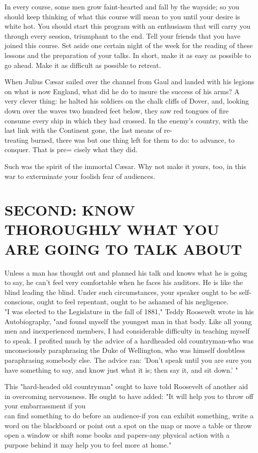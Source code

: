 \documentclass[10pt]{article}
\begin{document}
In every course, some men grow faint-hearted and fall by the wayside; so you should keep thinking of what this course will mean to you until your desire is white hot. You should start this program with an enthusiasm that will carry you through every session, triumphant to the end. Tell your friends that you have joined this course. Set aside one certain night of the week for the reading of these lessons and the preparation of your talks. In short, make it as easy as possible to go ahead. Make it as difficult as possible to retreat.

When Julius Cæsar sailed over the channel from Gaul and landed with his legions on what is now England, what did he do to insure the success of his arms? A very clever thing: he halted his soldiers on the chalk cliffs of Dover, and, looking down over the waves two hundred feet below, they saw red tongues of fire consume every ship in which they had crossed. In the enemy's country, with the last link with the Continent gone, the last means of re-\\
treating burned, there was but one thing left for them to do: to advance, to conquer. That is pre= cisely what they did.

Such was the spirit of the immortal Cæsar. Why not make it yours, too, in this war to exterminate your foolish fear of audiences.

\section*{SECOND: KNOW THOROUGHLY WHAT YOU ARE GOING TO TALK ABOUT}
Unless a man has thought out and planned his talk and knows what he is going to say, he can't feel very comfortable when he faces his auditors. He is like the blind leading the blind. Under such circumstances, your speaker ought to be self-conscious, ought to feel repentant, ought to be ashamed of his negligence.\\
"I was elected to the Legislature in the fall of 1881," Teddy Roosevelt wrote in his Autobiography, "and found myself the youngest man in that body. Like all young men and inexperienced members, I had considerable difficulty in teaching myself to speak. I profited much by the advice of a hardheaded old countryman-who was unconsciously paraphrasing the Duke of Wellington, who was himself doubtless paraphrasing somebody else. The advice ran: 'Don't speak until you are sure you have something to say, and know just what it is; then say it, and sit down.' "

This "hard-headed old countryman" ought to have told Roosevelt of another aid in overcoming nervousness. He ought to have added: "It will help you to throw off your embarrassment if you\\
can find something to do before an audience-if you can exhibit something, write a word on the blackboard or point out a spot on the map or move a table or throw open a window or shift some books and papers-any physical action with a purpose behind it may help you to feel more at home."
\end{document}
